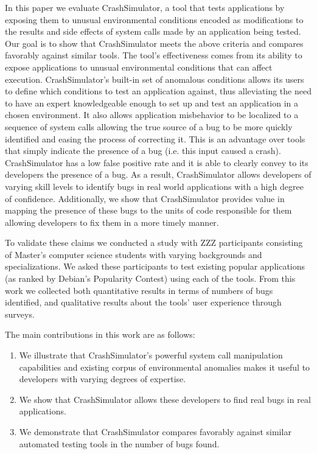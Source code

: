 In this paper we evaluate CrashSimulator, a tool that tests applications by
exposing them to unusual environmental conditions encoded as modifications
to the results and side effects of system calls made by an application
being tested.  Our goal is to show that CrashSimulator meets the above
criteria and compares favorably against similar tools.  The tool's
effectiveness comes from its ability to expose applications to unusual
environmental conditions that can affect execution.  CrashSimulator's
built-in set of anomalous conditions allows its users to define which
conditions to test an application against, thus alleviating the need to
have an expert knowledgeable enough to set up and test an application in a
chosen environment.  It also allows application misbehavior to be localized
to a sequence of system calls allowing the true source of a bug to be more
quickly identified and easing the process of correcting it.  This is an
advantage over tools that simply indicate the presence of a bug (i.e.  this
input caused a crash).  CrashSimulator has a low false positive rate and it
is able to clearly convey to its developers the presence of a bug.  As a
result, CrashSimulator allows developers of varying skill levels to
identify bugs in real world applications with a high degree of confidence.
Additionally, we show that CrashSimulator provides value in mapping the
presence of these bugs to the units of code responsible for them allowing
developers to fix them in a more timely manner.


To validate these claims we conducted a study with ZZZ participants
consisting of Master's computer science students with varying backgrounds
and specializations.  We asked these participants to test existing popular
applications (as ranked by Debian's Popularity Contest) using each of the
tools.  From this work we collected both quantitative results in terms of
numbers of bugs identified, and qualitative results about the tools' user
experience through surveys.

The main contributions in this work are as follows:
\begin{enumerate}

\item We illustrate that CrashSimulator's powerful system call manipulation
    capabilities and existing corpus of environmental anomalies makes it
        useful to developers with varying degrees of expertise.

\item We show that CrashSimulator allows these developers to find real bugs
in real applications.

\item We demonstrate that CrashSimulator compares favorably against similar
automated testing tools in the number of bugs found.

\end{enumerate}
